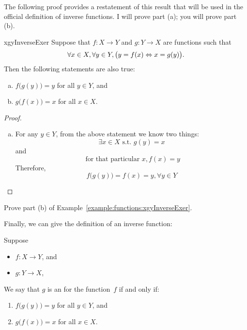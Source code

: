 The following proof provides a restatement of this result that will be used in the official definition of inverse functions. I will prove part (a); you will prove part (b).

 \begin{example}{xgyInverseExer}
 Suppose  that $f \colon X \to Y$
 and $g \colon Y \to X$ are functions such that
 $$ \forall x \in X, \forall y \in Y, \bigl(y = f(x) \Leftrightarrow x = g(y) \bigr). $$
Then the following statements are also true:
  \begin{enumerate}[(a)]
 \item  \label{x=g(y)->InverseExer-f(g(y))}
 $f \bigl( g(y) \bigr) = y$ for all $y \in Y$,
 and
 \item  \label{x=g(y)->InverseExer-g(f(x))}
 $g \bigl( f(x) \bigr) = x$ for all $x \in X$.
 \end{enumerate}

 
 \begin{proof}
 \begin{enumerate}[(a)]
 \item
For any $y \in Y$, from the above statement we know two things:  
$$\exists x \in X \mbox{ s.t. } g(y) = x$$ 
and
$$\mbox{ for that particular } x, f(x) = y$$
Therefore, 
$$f \bigl( g(y) \bigr) = f(x) = y, \forall y \in Y$$
\end{enumerate}
\end{proof}

\begin{exercise}{88}
Prove part (b) of Example~\ref{example:functions:xgyInverseExer}.
\end{exercise}
 \end{example}

Finally, we can give the definition of an inverse function:

 \begin{defn}\label{def:invfna}
 Suppose 
 \begin{itemize}
 \item $f \colon X \to Y$,
 and
 \item $g \colon Y \to X$,
\end{itemize}
We say that $g$ is an  for the function~$f$ if and only if:
 \begin{enumerate} \renewcommand{\theenumi}{\alph{enumi}}
 \item $f \bigl( g(y) \bigr) = y$ for all $y \in Y$,
 and
 \item $g \bigl( f(x) \bigr) = x$ for all $x \in X$.
 \end{enumerate}
 \end{defn}
 

